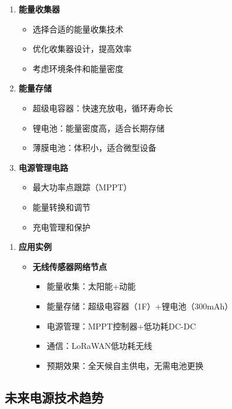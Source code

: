 \documentclass[12pt,UTF8]{ctexbook}
\begin{document}
\begin{enumerate}
    \item \textbf{能量收集器}
    \begin{itemize}
        \item 选择合适的能量收集技术
        \item 优化收集器设计，提高效率
        \item 考虑环境条件和能量密度
    \end{itemize}
    
    \item \textbf{能量存储}
    \begin{itemize}
        \item 超级电容器：快速充放电，循环寿命长
        \item 锂电池：能量密度高，适合长期存储
        \item 薄膜电池：体积小，适合微型设备
    \end{itemize}
    
    \item \textbf{电源管理电路}
    \begin{itemize}
        \item 最大功率点跟踪（MPPT）
        \item 能量转换和调节
        \item 充电管理和保护
    \end{itemize}
\end{enumerate}

\begin{enumerate}
    \item \textbf{应用实例}
    \begin{itemize}
        \item \textbf{无线传感器网络节点}
        \begin{itemize}
            \item 能量收集：太阳能+动能
            \item 能量存储：超级电容器（1F）+锂电池（300mAh）
            \item 电源管理：MPPT控制器+低功耗DC-DC
            \item 通信：LoRaWAN低功耗无线
            \item 预期效果：全天候自主供电，无需电池更换
        \end{itemize}
    \end{itemize}
\end{enumerate}

\subsection{未来电源技术趋势}
\end{document}
